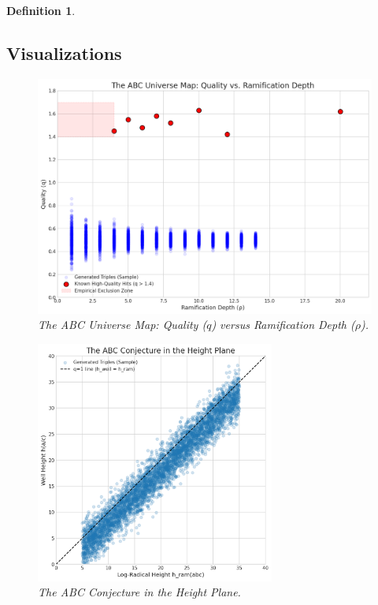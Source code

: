 \documentclass[11pt,a4paper]{article}
\newtheorem{definition}{Definition}[section]
\begin{document}
\begin{definition}
\subsection{Visualizations}
\begin{figure}[h!]
    \centering
    \includegraphics[width=\textwidth]{../figures/quality_vs_rho.png}
    \caption{The ABC Universe Map: Quality ($q$) versus Ramification Depth ($\rho$).}
    \label{fig:quality-rho}
\end{figure}
\begin{figure}[h!]
    \centering
    \includegraphics[width=0.7\textwidth]{../figures/height_plane.png}
    \caption{The ABC Conjecture in the Height Plane.}
    \label{fig:height-plane}
\end{figure}


\end{definition}
\end{document}
